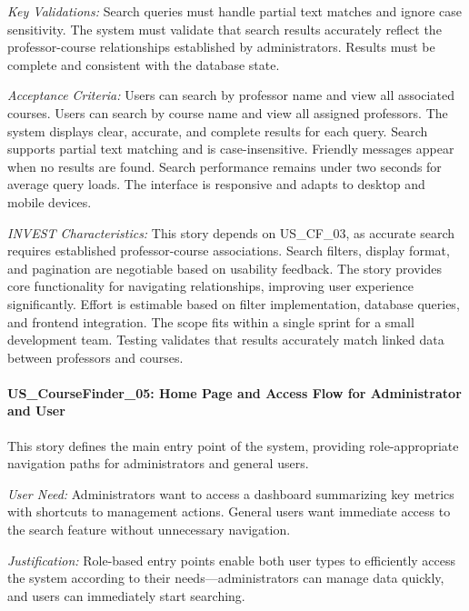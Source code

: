 \documentclass[12pt,a4paper]{article}
\begin{document}
\textit{Key Validations:} Search queries must handle partial text matches and ignore case sensitivity. The system must validate that search results accurately reflect the professor-course relationships established by administrators. Results must be complete and consistent with the database state.\newline

\textit{Acceptance Criteria:} Users can search by professor name and view all associated courses. Users can search by course name and view all assigned professors. The system displays clear, accurate, and complete results for each query. Search supports partial text matching and is case-insensitive. Friendly messages appear when no results are found. Search performance remains under two seconds for average query loads. The interface is responsive and adapts to desktop and mobile devices.\newline

\textit{INVEST Characteristics:} This story depends on US\_CF\_03, as accurate search requires established professor-course associations. Search filters, display format, and pagination are negotiable based on usability feedback. The story provides core functionality for navigating relationships, improving user experience significantly. Effort is estimable based on filter implementation, database queries, and frontend integration. The scope fits within a single sprint for a small development team. Testing validates that results accurately match linked data between professors and courses.\newline

\paragraph{US\_CourseFinder\_05: Home Page and Access Flow for Administrator and User}

This story defines the main entry point of the system, providing role-appropriate navigation paths for administrators and general users.\newline

\textit{User Need:} Administrators want to access a dashboard summarizing key metrics with shortcuts to management actions. General users want immediate access to the search feature without unnecessary navigation.\newline

\textit{Justification:} Role-based entry points enable both user types to efficiently access the system according to their needs—administrators can manage data quickly, and users can immediately start searching.\newline
\end{document}
